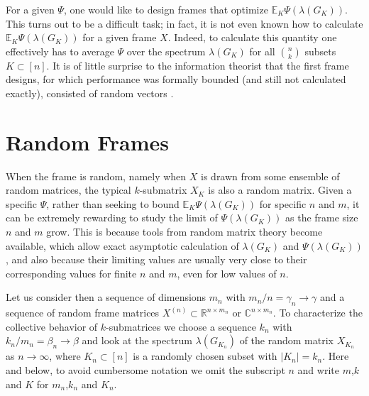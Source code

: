 \documentclass[a4paper,12pt]{article}
\newcommand{\R}{\ensuremath{\mathbb{R}}}
\newcommand{\E}{\ensuremath{\mathbb{E}}}
\newcommand{\C}{\ensuremath{\mathbb{C}}}
\newcommand{\m}{m}
\newcommand{\specstat}{\ensuremath{\Psi}}
\newcommand{\Xk}{\ensuremath{X_K}}
\newcommand{\Xkn}{\ensuremath{X_{K_n}}}
\newcommand{\Gk}{\ensuremath{G_K}}
\newcommand{\Gkn}{\ensuremath{G_{K_n}}}
\begin{document}
For a given $\specstat$, one would like to design frames that optimize $\E_K
\specstat(\lambda(\Gk))$.  This turns out to be a difficult task; in fact, it is
not even known how to calculate $\E_K \specstat(\lambda(\Gk))$ for a given frame
$X$.
Indeed, to calculate this quantity one effectively has to average $\specstat$
over  the spectrum $\lambda(\Gk)$ for all $\binom{n}{k}$ subsets $K\subset [n]$.
It is of little surprise to the information theorist that the first frame
designs, for which performance was formally bounded (and still not calculated
exactly), consisted of random vectors
\cite{CT06,Nelson,Rudelson,Oded,Tropp,Charaghchi}.


\section*{Random Frames} \label{sec:random_frames}

When the frame is random, namely when $X$ is drawn from some ensemble of random
matrices, the typical $k$-submatrix $\Xk$ is also a random matrix. Given a
specific $\specstat$, rather than seeking to bound $\E_K
\specstat(\lambda(\Gk))$ for specific $n$ and $\m$, it can be extremely
rewarding to study the limit of $\specstat(\lambda(\Gk))$ as the frame size $n$
and $\m$ grow. This is because tools from random matrix theory become available,
which allow exact asymptotic calculation of $\lambda(\Gk)$ and
$\specstat(\lambda(\Gk))$, and also because their limiting values are usually
very close to their corresponding values for finite $n$ and $\m$, even for low
values of $n$.

Let us consider then a sequence of dimensions $\m_n$ with $\m_n/n=\gamma_n\to \gamma$
and a sequence of 
random frame matrices $X^{(n)}\subset \R^{n\times\m_n}$ or $\C^{n\times\m_n}$.
To
characterize the collective behavior of $k$-submatrices we choose a sequence
$k_n$ with $k_n/\m_n=\beta_n\to \beta$ 
and look at the spectrum
$\lambda(\Gkn)$ 
of the random
matrix 
$\Xkn$ as $n\to\infty$, where $K_n\subset [n]$ is a randomly chosen 
subset with $|K_n|=k_n$. Here and below, to avoid cumbersome notation we omit the subscript $n$ and write $m$,$k$ and $K$ for $m_n$,$k_n$ and $K_n$.
\end{document}
